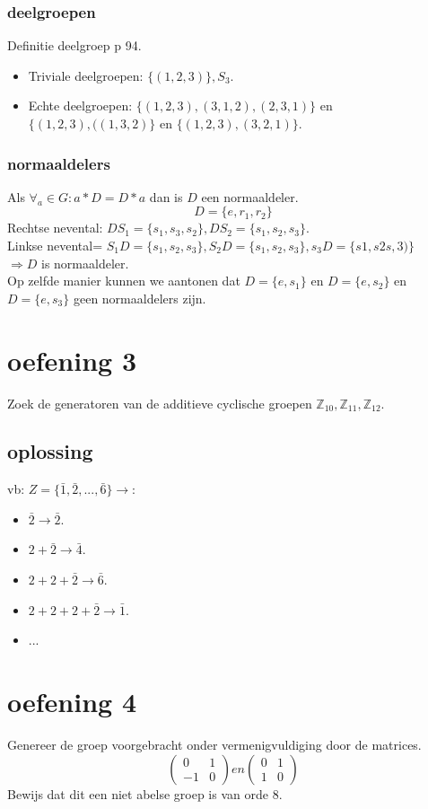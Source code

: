 \documentclass[12pt,a4paper]{article}
\begin{document}
\subsubsection*{deelgroepen}
Definitie deelgroep p 94.
\begin{itemize}
\item Triviale deelgroepen: $\{(1,2,3)\},S_3$.
\item Echte deelgroepen: $\{(1,2,3),(3,1,2),(2,3,1)\}$ en $\{(1,2,3),((1,3,2)\}$ en $\{(1,2,3),(3,2,1)\}$.
\end{itemize}
\subsubsection*{normaaldelers}
Als $\forall_a \in G: a*D=D*a$ dan is $D$ een normaaldeler.
\[
D=\{e,r_1,r_2\}
\]
Rechtse nevental: $DS_1=\{s_1,s_3,s_2\},DS_2=\{s_1,s_2,s_3\}$.
\\Linkse nevental= $S_1D=\{s_1,s_2,s_3\},S_2D=\{s_1,s_2,s_3\},s_3D=\{s1,s2s,3)\}$
\\$\Rightarrow D$ is normaaldeler.
\\Op zelfde manier kunnen we aantonen dat $D=\{e,s_1\}$ en $D=\{e,s_2\}$ en $D=\{e,s_3\}$ geen normaaldelers zijn.
\section*{oefening 3}
Zoek de generatoren van de additieve cyclische groepen $\mathbb{Z}_{10},\mathbb{Z}_{11},\mathbb{Z}_{12}$.
\subsection*{oplossing}
vb: $Z=\{\bar{1},\bar{2},...,\bar{6}\} \rightarrow$:
\begin{itemize}
\item $\bar{2} \rightarrow \bar{2}$.
\item $2+\bar{2} \rightarrow \bar{4}$.
\item $2+2+\bar{2} \rightarrow\bar{6}$.
\item $2+2+2+\bar{2} \rightarrow \bar{1}$.
\item ...
\end{itemize}
\pagebreak
\section*{oefening 4}

Genereer de groep voorgebracht onder vermenigvuldiging door de matrices.
\[ \left( \begin{array}{cc}
0 & 1 \\
-1 & 0
\end{array} \right)
en
\left( \begin{array}{cc}
0 & 1 \\
1 & 0
\end{array} \right)
\]
Bewijs dat dit een niet abelse groep is van orde 8.
\end{document}
